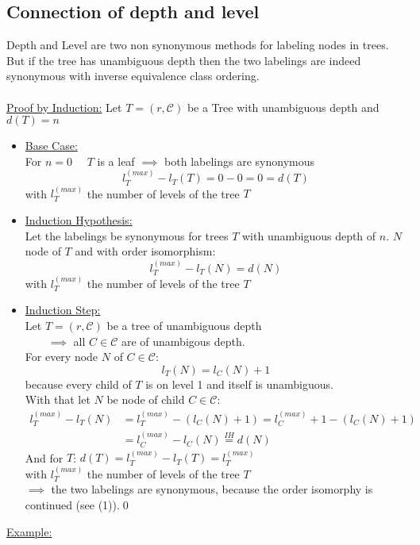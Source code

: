 \documentclass[a4paper,12pt]{article}
\begin{document}
	\subsection{Connection of depth and level}
	Depth and Level are two non synonymous methods for labeling nodes in trees.\\
	But if the tree has unambiguous depth then the two labelings are indeed synonymous with inverse equivalence class ordering.
	\\\\
	 \underline{Proof by Induction:} Let $T=(r,\mathcal{C})$ be a Tree with unambiguous depth and $d(T)=n$\\
	 \begin{itemize}
	 	\item \underline{Base Case:}\\
	 		For $n=0\quad$ $T$ is a leaf $\implies$ both labelings are synonymous
	 		\[l_T^{(max)}-l_T(T)=0-0=0=d(T)\]
	 		with $l_T^{(max)}$ the number of levels of the tree $T$
	 	\item \underline{Induction Hypothesis:}\\
	 		Let the labelings be synonymous for trees $T$ with unambiguous depth of $n$.
	 		$N$ node of $T$ and with order isomorphism:
	 		\[l_T^{(max)}-l_T(N)=d(N)\]
	 		with $l_T^{(max)}$ the number of levels of the tree $T$
	 	\item \underline{Induction Step:}\\
	 		Let $T=(r,\mathcal{C})$ be a tree of unambiguous depth\\
	 		$\qquad\implies $ all $C\in\mathcal{C}$ are of unambigous depth.\\
	 		For every node $N$ of $C\in\mathcal{C}:$\[ l_T(N)=l_C(N)+1\] because every child of $T$ is on level 1 and itself is unambiguous.\\
	 		With that let $N$ be node of child $C\in\mathcal{C}$:
	 		\begin{align}
	 			l_T^{(max)}-l_T(N)&=l_T^{(max)}-(l_C(N) + 1)=l_C^{(max)} + 1 -(l_C(N) + 1)\\
	 			&= l_C^{(max)}-l_C(N) \overset{IH}{=} d(N)
	 		\end{align}
 			And for $T$: $d(T)=l_T^{(max)} - l_T(T)=l_T^{(max)}$\\
	 		with $l_T^{(max)}$ the number of levels of the tree $T$\\
	 		$\implies$ the two labelings are synonymous, because the order isomorphy is continued  (see (1)).\qed
	 \end{itemize}
	 \underline{Example:}\\
\end{document}
